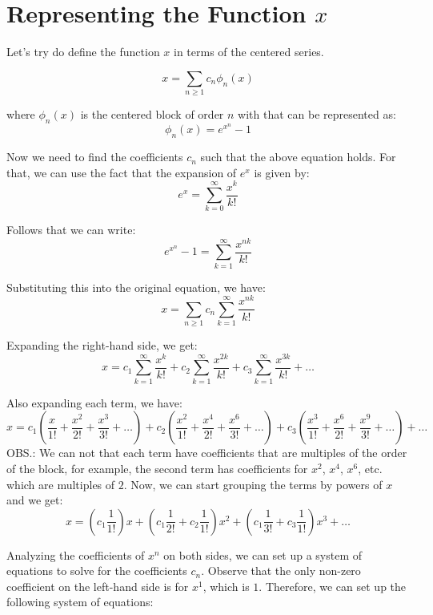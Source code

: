 
\chapter{Representing the Function $x$}


Let's try do define the function $x$ in terms of the centered series.

    \[
    x = \sum_{n\geq1} c_n \phi_n(x)
    \]

where $\phi_n(x)$ is the centered block of order $n$ with that can be represented as:
    \[
    \phi_n(x) = e^{x^n} - 1
    \]

Now we need to find the coefficients $c_n$ such that the above equation holds. For that, we can use the fact that
the expansion of $e^{x}$ is given by:
    \[
    e^{x} = \sum_{k=0}^{\infty} \frac{x^{k}}{k!}
    \]

Follows that we can write:
    \[
    e^{x^n} - 1 = \sum_{k=1}^{\infty} \frac{x^{nk}}{k!}
    \]

Substituting this into the original equation, we have:
    \[
    x = \sum_{n\geq1} c_n \sum_{k=1}^{\infty} \frac{x^{nk}}{k!}
    \]

Expanding the right-hand side, we get:
    \[
    x = c_1 \sum_{k=1}^{\infty} \frac{x^{k}}{k!} + c_2 \sum_{k=1}^{\infty} \frac{x^{2k}}{k!} + c_3 \sum_{k=1}^{\infty} \frac{x^{3k}}{k!} + \ldots
    \]

Also expanding each term, we have:
    \[
    x = c_1 \left( \frac{x}{1!} + \frac{x^2}{2!} + \frac{x^3}{3!} + \ldots \right) + c_2 \left( \frac{x^2}{1!} + \frac{x^4}{2!} + \frac{x^6}{3!} + \ldots \right) + c_3 \left( \frac{x^3}{1!} + \frac{x^6}{2!} + \frac{x^9}{3!} + \ldots \right) + \ldots
    \]
OBS.: We can not that each term have coefficients that are multiples of the order of the block, for example, the second term has coefficients for $x^2$, $x^4$, $x^6$, etc. which are multiples of $2$.
Now, we can start grouping the terms by powers of $x$ and we get:
    \[
    x = \left( c_1 \frac{1}{1!} \right) x + \left( c_1 \frac{1}{2!} + c_2 \frac{1}{1!} \right) x^2 + \left( c_1 \frac{1}{3!} + c_3 \frac{1}{1!} \right) x^3 + \ldots
    \]

Analyzing the coefficients of $x^n$ on both sides, we can set up a system of equations to solve for the coefficients $c_n$. Observe that the only non-zero coefficient on the left-hand side is for $x^1$, which is $1$. Therefore, we can set up the following system of equations:

